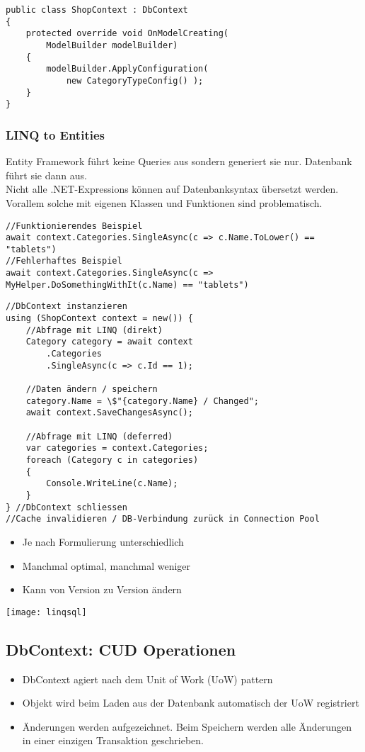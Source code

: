 \begin{multicols*}{2}
\begin{lstlisting}
public class ShopContext : DbContext 
{
    protected override void OnModelCreating(
        ModelBuilder modelBuilder)
    {
        modelBuilder.ApplyConfiguration(
            new CategoryTypeConfig() );
    }
}
\end{lstlisting}

\subsubsection{LINQ to Entities}
Entity Framework führt keine Queries aus sondern generiert sie nur. Datenbank führt sie dann aus.\\ 
Nicht alle .NET-Expressions können auf Datenbanksyntax übersetzt werden.
Vorallem solche mit eigenen Klassen und Funktionen sind problematisch.
\begin{lstlisting}
//Funktionierendes Beispiel
await context.Categories.SingleAsync(c => c.Name.ToLower() == "tablets")
//Fehlerhaftes Beispiel
await context.Categories.SingleAsync(c => MyHelper.DoSomethingWithIt(c.Name) == "tablets")
\end{lstlisting}
\begin{lstlisting}
//DbContext instanzieren
using (ShopContext context = new()) {
    //Abfrage mit LINQ (direkt)
    Category category = await context 
        .Categories
        .SingleAsync(c => c.Id == 1);
    
    //Daten ändern / speichern
    category.Name = \$"{category.Name} / Changed";
    await context.SaveChangesAsync();
    
    //Abfrage mit LINQ (deferred)
    var categories = context.Categories;
    foreach (Category c in categories)
    {
        Console.WriteLine(c.Name);
    }
} //DbContext schliessen
//Cache invalidieren / DB-Verbindung zurück in Connection Pool
\end{lstlisting}
\begin{itemize}
    \item Je nach Formulierung unterschiedlich
    \item Manchmal optimal, manchmal weniger
    \item Kann von Version zu Version ändern
\end{itemize}
\texttt{[image: linqsql]}

\subsection{DbContext: CUD Operationen}
\begin{itemize}
    \item DbContext agiert nach dem Unit of Work (UoW) pattern
    \item Objekt wird beim Laden aus der Datenbank automatisch der UoW registriert
    \item Änderungen werden aufgezeichnet. Beim Speichern werden alle Änderungen in einer einzigen Transaktion geschrieben.
\end{itemize}

\end{multicols*}
